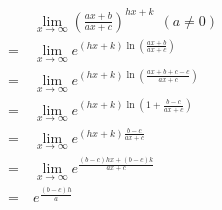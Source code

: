 \documentclass{article}
\begin{document}
	\large
	\setlength{\baselineskip}{3em}
	
	\begin{align*}
		&\ \lim_{x \to \infty} (\frac{a x + b}{a x + c})^{h x + k} \ \ (a \neq 0)
		\\
		= &\ \lim_{x \to \infty} e^{(h x + k) \ln{(\frac{a x + b}{a x + c})}}
		\\
		= &\ \lim_{x \to \infty} e^{(h x + k) \ln{(\frac{a x + b + c - c}{a x + c})}}
		\\
		= &\ \lim_{x \to \infty} e^{(h x + k) \ln{(1 + \frac{b - c}{a x + c})}}
		\\
		= &\ \lim_{x \to \infty} e^{(h x + k) \frac{b - c}{a x + c}}
		\\
		= &\ \lim_{x \to \infty} e^{\frac{(b - c) h x + (b - c) k}{a x + c}}
		\\
		= &\ e^{\frac{(b - c) h}{a}}
	\end{align*}
\end{document}
